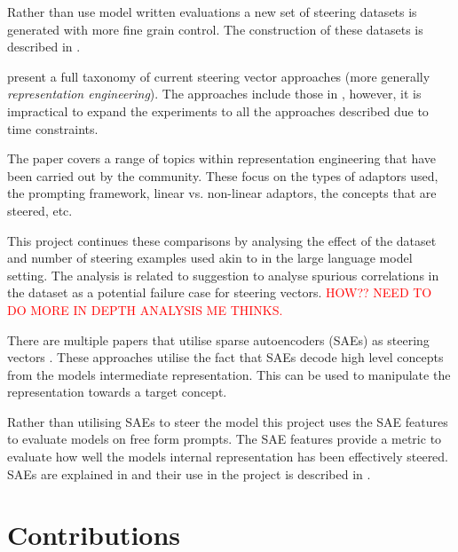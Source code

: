 Rather than use model written evaluations \citep{mwe} a new set of steering datasets is generated with more fine grain control.
The construction of these datasets is described in .

present a full taxonomy of current steering vector approaches (more generally \emph{representation engineering}).
The approaches include those in \citet{steering-clear}, however, it is impractical to expand the experiments to all the approaches described due to time constraints.

The paper covers a range of topics within representation engineering that have been carried out by the community.
These focus on the types of adaptors used, the prompting framework, linear vs. non-linear adaptors, the concepts that are steered, etc.

This project continues these comparisons by analysing the effect of the dataset and number of steering examples used akin to \citet{steering-clear} in the large language model setting.
The analysis is related to \cites{steering-taxonomy} suggestion to analyse spurious correlations in the dataset as a potential failure case for steering vectors.
\textcolor{red}{HOW?? NEED TO DO MORE IN DEPTH ANALYSIS ME THINKS.}

There are multiple papers that utilise sparse autoencoders (SAEs) as steering vectors \citep{sae-improved, sae-steering, icl-sae}.
These approaches utilise the fact that SAEs decode high level concepts from the models intermediate representation.
This can be used to manipulate the representation towards a target concept.

Rather than utilising SAEs to steer the model this project uses the SAE features to evaluate models on free form prompts.
The SAE features provide a metric to evaluate how well the models internal representation has been effectively steered.
SAEs are explained in  and their use in the project is described in .

\section{Contributions}
